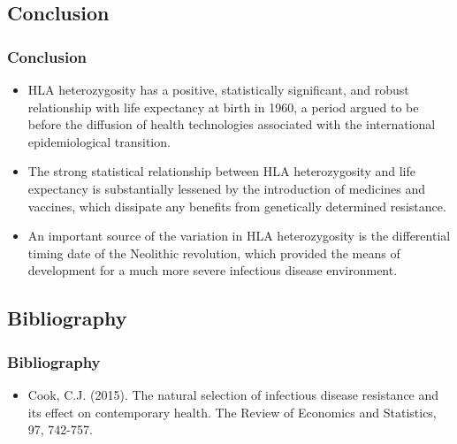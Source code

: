 \documentclass[pdftex,12pt,xcolor=pdftex,table]{beamer}
\theoremstyle{definition}
\theoremstyle{remark}
\numberwithin{equation}{section}
\numberwithin{figure}{section}
\begin{document}
\begin{frame}\section{Conclusion}
\frametitle{Conclusion}
\begin{itemize}
    \item HLA heterozygosity has a positive, statistically significant, and robust relationship with life expectancy at birth in 1960, a period argued to be before the diffusion of health technologies associated with the international epidemiological transition.
    \item The strong statistical relationship between HLA heterozygosity and life expectancy is substantially lessened by the introduction of medicines and vaccines, which dissipate any benefits from genetically determined resistance.
    \item An important source of the variation in HLA heterozygosity is the differential timing date of the Neolithic revolution, which provided the means of development for a much more severe infectious disease environment.
    
\end{itemize}
\end{frame}


\begin{frame}\section{Bibliography}
\frametitle{Bibliography}
\begin{itemize}
    \item 
Cook, C.J. (2015). The natural selection of infectious disease resistance and its effect on contemporary health.  The Review of Economics and Statistics, 97, 742-757.
    
\end{itemize}
\end{frame}
\end{document}
